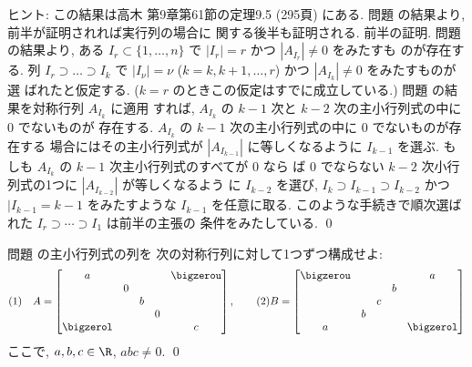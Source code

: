 \documentclass[12pt,twoside]{jarticle}
\begin{document}
\noindent
ヒント: この結果は高木 \cite{takagi1} 第9章第61節の定理9.5 (295頁) にある.  
問題  の結果より, 前半が証明されれば実行列の場合に
関する後半も証明される.  
前半の証明.  問題  の結果より, 
ある $I_r\subset\{1,\dots,n\}$ で $|I_r|=r$ かつ $|A_{I_r}|\ne 0$ をみたすも
のが存在する. 列 $I_r\supset\dots\supset I_k$ 
で $|I_\nu|=\nu$ ($k=k,k+1,\dots,r$) かつ $|A_{I_k}|\ne 0$ をみたすものが選
ばれたと仮定する. ($k=r$ のときこの仮定はすでに成立している.)
問題  の結果を対称行列 $A_{I_k}$ に適用
すれば, $A_{I_k}$ の $k-1$ 次と $k-2$ 次の主小行列式の中に $0$ でないものが
存在する. $A_{I_k}$ の $k-1$ 次の主小行列式の中に $0$ でないものが存在する
場合にはその主小行列式が $|A_{I_{k-1}}|$ に等しくなるように $I_{k-1}$ を選ぶ.
もしも $A_{I_k}$ の $k-1$ 次主小行列式のすべてが $0$ なら
ば $0$ でならない $k-2$ 次小行列式の1つに $|A_{I_{k-2}}|$ が等しくなるよう
に $I_{k-2}$ を選び, $I_k\supset I_{k-1}\supset I_{k-2}$ かつ $|I_{k-1}=k-1$ 
をみたすような $I_{k-1}$ を任意に取る.
このような手続きで順次選ばれた $I_r\supset\cdots\supset I_1$ は前半の主張の
条件をみたしている.
\qed

\bigskip

\begin{question}
\label{q:takagi-theorem9.5-example}
  問題  の主小行列式の列を
  次の対称行列に対して1つずつ構成せよ:
  \begin{equation*}
    (1)\quad
    A = 
    \begin{bmatrix}
              a &   &   &   & \bigzerou \\
                & 0 &   &   & \\
                &   & b &   & \\
                &   &   & 0 & \\
      \bigzerol &   &   &   & c \\
    \end{bmatrix},
    \qquad
    (2)
    B =
    \begin{bmatrix}
      \bigzerou &   &   &   & a \\
                &   &   & b & \\
                &   & c &   & \\
                & b &   &   & \\
              a &   &   &   & \bigzerol \\
    \end{bmatrix}
  \end{equation*}
  ここで, $a,b,c\in\R$, $abc\ne 0$. 
  \qed
\end{question}
\end{document}
